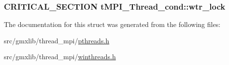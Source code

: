\hypertarget{structtMPI__Thread__cond_a333811c3a5bcca48b981931fa357b590}{
\subsubsection[{wtr\-\_\-lock}]{\setlength{\rightskip}{0pt plus 5cm}\-C\-R\-I\-T\-I\-C\-A\-L\-\_\-\-S\-E\-C\-T\-I\-O\-N {\bf t\-M\-P\-I\-\_\-\-Thread\-\_\-cond\-::wtr\-\_\-lock}}}\label{structtMPI__Thread__cond_a333811c3a5bcca48b981931fa357b590}


\-The documentation for this struct was generated from the following files\-:\begin{DoxyCompactItemize}
\item 
src/gmxlib/thread\-\_\-mpi/\hyperlink{pthreads_8h}{pthreads.\-h}\item 
src/gmxlib/thread\-\_\-mpi/\hyperlink{winthreads_8h}{winthreads.\-h}\end{DoxyCompactItemize}
